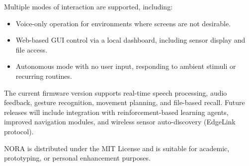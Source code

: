 Multiple modes of interaction are supported, including:

\begin{itemize}
    \item Voice-only operation for environments where screens are not desirable.
    \item Web-based GUI control via a local dashboard, including sensor display and file access.
    \item Autonomous mode with no user input, responding to ambient stimuli or recurring routines.
\end{itemize}

The current firmware version supports real-time speech processing, audio feedback, gesture recognition, movement planning, and file-based recall. Future releases will include integration with reinforcement-based learning agents, improved navigation modules, and wireless sensor auto-discovery (EdgeLink protocol).

NORA is distributed under the MIT License and is suitable for academic, prototyping, or personal enhancement purposes.


